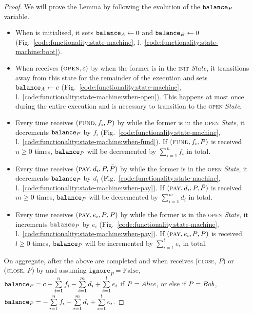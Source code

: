 \begin{proof}
  We will prove the Lemma by following the evolution of the $\texttt{balance}_{P}$
  variable.
  \begin{itemize}
    \item When \fchan is initialised, it sets $\texttt{balance}_{A} \gets 0$ and
    $\texttt{balance}_{B} \gets 0$ (Fig.~\ref{code:functionality:state-machine},
    l.~\ref{code:functionality:state-machine:boot}).
    \item When \fchan receives $(\textsc{open}, c)$ by \simulator when the
    former is in the \textsc{init} \textit{State}, it transitions away from this
    state for the remainder of the execution and sets $\texttt{balance}_{A} \gets c$
    (Fig.~\ref{code:functionality:state-machine},
    l.~\ref{code:functionality:state-machine:when-open}). This happens at most
    once during the entire execution and is necessary to transition to the
    \textsc{open} \textit{State}.
    \item Every time \fchan receives $(\textsc{fund}, f_i, P)$ by \simulator
    while the former is in the \textsc{open} \textit{State}, it decrements
    $\texttt{balance}_{P}$ by $f_i$ (Fig.~\ref{code:functionality:state-machine},
    l.~\ref{code:functionality:state-machine:when-fund}). If $(\textsc{fund},
    f_i, P)$ is received $n \geq 0$ times, $\texttt{balance}_{P}$ will be decremented by
    $\sum\limits_{i=1}^n f_i$ in total.
    \item Every time \fchan receives $(\textsc{pay}, d_i, P, \bar{P})$ by
    \simulator while the former is in the \textsc{open} \textit{State}, it
    decrements $\texttt{balance}_{P}$ by $d_i$
    (Fig.~\ref{code:functionality:state-machine},
    l.~\ref{code:functionality:state-machine:when-pay}). If $(\textsc{pay}, d_i,
    P, \bar{P})$ is received $m \geq 0$ times, $\texttt{balance}_{P}$ will be decremented
    by $\sum\limits_{i=1}^m d_i$ in total.
    \item Every time \fchan receives $(\textsc{pay}, e_i, \bar{P}, P)$ by
    \simulator while the former is in the \textsc{open} \textit{State}, it
    increments $\texttt{balance}_{P}$ by $e_i$
    (Fig.~\ref{code:functionality:state-machine},
    l.~\ref{code:functionality:state-machine:when-pay}). If $(\textsc{pay}, e_i,
    \bar{P}, P)$ is received $l \geq 0$ times, $\texttt{balance}_{P}$ will be incremented
    by $\sum\limits_{i=1}^l e_i$ in total.
  \end{itemize}
  On aggregate, after the above are completed and when \fchan receives
  (\textsc{close}, $P$) or (\textsc{close}, $\bar{P}$) by \simulator and
  assuming $\texttt{ignore}_P = \mathrm{False}$, $\texttt{balance}_{P} = c -
  \sum\limits_{i=1}^n f_i - \sum\limits_{i=1}^m d_i + \sum\limits_{i=1}^l e_i$
  if $P = \mathit{Alice}$, or else if $P = \mathit{Bob}$, $\texttt{balance}_{P} = - \sum\limits_{i=1}^n
  f_i - \sum\limits_{i=1}^m d_i + \sum\limits_{i=1}^l e_i$.
\end{proof}
